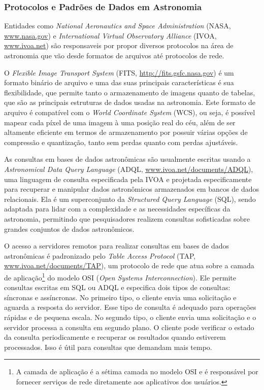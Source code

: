 \documentclass[a4,12pt]{horizon-theme}
\begin{document}
\subsubsection{Protocolos e Padrões de Dados em Astronomia}
\label{sec:protocolos}
Entidades como \emph{National Aeronautics and Space Administration} (NASA, \url{www.nasa.gov}) e \emph{International Virtual Observatory Alliance} (IVOA, \url{www.ivoa.net}) são responsaveis por propor diversos protocolos na área de astronomia que vão desde formatos de arquivos até protocolos  de rede.

O \emph{Flexible Image Transport System} (FITS, \url{http://fits.gsfc.nasa.gov}) é um formato binário de arquivo e uma das suas principais características é sua flexibilidade, que permite tanto o armazenamento de imagens quanto de tabelas, que são as principais estruturas de dados usadas na astronomia. Este formato de arquivo é compatível com o \emph{World Coordinate System} (WCS), ou seja, é possível mapear cada píxel de uma imagem à uma posição real do céu, além de ser altamente eficiente em termos de armazenamento por possuir várias opções de compressão e quantização, tanto sem perdas quanto com perdas ajustáveis.

As consultas em bases de dados astronômicas são usualmente escritas usando a \emph{Astronomical Data Query Language} (ADQL, \url{www.ivoa.net/documents/ADQL}), uma linguagem de consulta especificada pela IVOA e projetada especificamente para recuperar e manipular dados astronômicos armazenados em bancos de dados relacionais. Ela é um superconjunto da \emph{Structured Query Language} (SQL), sendo adaptada para lidar com a complexidade e as necessidades específicas da astronomia, permitindo que pesquisadores realizem consultas sofisticadas sobre grandes conjuntos de dados astronômicos.

O acesso a servidores remotos para realizar consultas em bases de dados astronômicas é padronizado pelo \emph{Table Access Protocol} (TAP, \url{www.ivoa.net/documents/TAP}), um protocolo de rede que atua sobre a camada de aplicação\footnote{A camada de aplicação é a sétima camada no modelo OSI e é responsável por fornecer serviços de rede diretamente aos aplicativos dos usuários.} do modelo OSI (\emph{Open Systems Interconnection}). Ele permite consultas escritas em SQL ou ADQL e especifica dois tipos de consultas: síncronas e assíncronas. No primeiro tipo, o cliente envia uma solicitação e aguarda a resposta do servidor. Esse tipo de consulta é adequado para operações rápidas e de pequena escala. No segundo tipo, o cliente envia uma solicitação e o servidor processa a consulta em segundo plano. O cliente pode verificar o estado da consulta periodicamente e recuperar os resultados quando estiverem processados. Isso é útil para consultas que demandam mais tempo.
\end{document}
